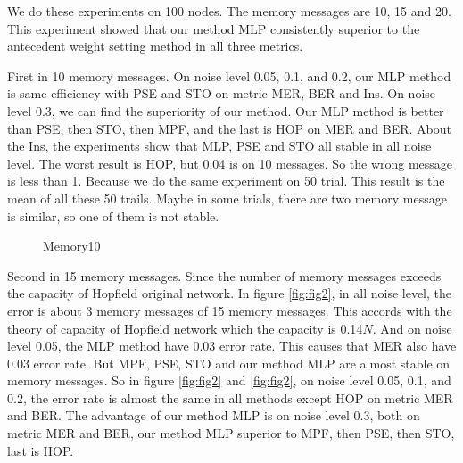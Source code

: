 We do these experiments on 100 nodes. The memory messages are 10, 15 and 20. This experiment showed that our method MLP consistently superior to the antecedent weight setting method in all three metrics.

First in 10 memory messages. On noise level 0.05, 0.1, and 0.2, our MLP method is same efficiency with PSE and STO on metric MER, BER and Ins. On noise level 0.3, we can find the superiority of our method. Our MLP method is better than PSE, then STO, then MPF, and the last is HOP on MER and BER. About the Ins, the experiments show that MLP, PSE and STO all stable in all noise level. The worst result is HOP, but 0.04 is on 10 messages. So the wrong message is less than 1. Because we do the same experiment on 50 trial. This result is the mean of all these 50 trails. Maybe in some trials, there are two memory message is similar, so one of them is not stable.


\begin{figure*}[!h]
  \caption{Memory10}
  \label{fig:fig1}
\end{figure*}


Second in 15 memory messages. Since the number of memory messages exceeds the capacity of Hopfield original network. In figure \ref{fig:fig2}, in all noise level, the error is about 3 memory messages of 15 memory messages. This accords with the theory of capacity of Hopfield network which the capacity is 0.14$N$. And on noise level 0.05, the MLP method have 0.03 error rate. This causes that MER also have 0.03 error rate.  But MPF, PSE, STO and our method MLP are almost stable on memory messages. So in figure \ref{fig:fig2} and \ref{fig:fig2}, on noise level 0.05, 0.1, and 0.2, the error rate is almost the same in all methods except HOP on metric MER and BER. The advantage of our method MLP is on noise level 0.3, both on metric MER and BER, our method MLP superior to MPF, then PSE, then STO, last is HOP.

